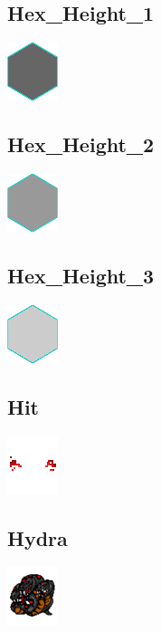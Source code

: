 \documentclass[a4paper,12pt]{scrartcl}
\begin{document}
	\subsection{Hex\_Height\_1}
	\begin{center}\includegraphics{Prog2_EA_V2/Art/Hex_Height_1.png}\end{center}
	\subsection{Hex\_Height\_2}
	\begin{center}\includegraphics{Prog2_EA_V2/Art/Hex_Height_2.png}\end{center}
	\subsection{Hex\_Height\_3}
	\begin{center}\includegraphics{Prog2_EA_V2/Art/Hex_Height_3.png}\end{center}
	\subsection{Hit}
	\begin{center}\includegraphics{Prog2_EA_V2/Art/Hit.png}\end{center}
	\subsection{Hydra}
	\begin{center}\includegraphics{Prog2_EA_V2/Art/Hydra.png}\end{center}
\end{document}
